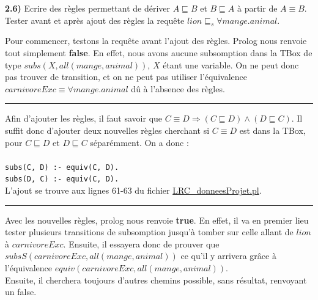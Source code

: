\documentclass[a4paper,12pt]{report}
\begin{document}

\newpage

{}

\textbf{2.6)} Ecrire des règles permettant de dériver \(A \sqsubseteq B\) et \(B \sqsubseteq A\) à partir de \(A \equiv B\). Tester avant et 
    après ajout des règles la requête \(lion \sqsubseteq_s \forall mange.animal\).



\begin{tcolorbox}[colback=gray!10, colframe=blue!30, coltitle=black, title=Réponse à la question 2.6 - 1/1]

    Pour commencer, testons la requête avant l'ajout des règles. Prolog nous renvoie tout simplement \textbf{false}. En effet, nous avons aucune
        subsomption dans la TBox de type \(subs(X, all(mange, animal))\), \(X\) étant une variable. On ne peut donc pas trouver de transition, et 
        on ne peut pas utiliser l'équivalence \(carnivoreExc \equiv \forall mange.animal\) dû à l'absence des règles.

    \vspace{0.5cm}
    \hrule
    \vspace{0.5cm}

    Afin d'ajouter les règles, il faut savoir que \(C \equiv D \Rightarrow (C \sqsubseteq D) \land (D \sqsubseteq C)\). Il suffit donc d'ajouter
        deux nouvelles règles cherchant si \(C \equiv D\) est dans la TBox, pour \(C \sqsubseteq D\) et \(D \sqsubseteq C\) séparémment. On a donc :\\\\
    \texttt{subs(C, D) :- equiv(C, D).}\\
    \texttt{subs(D, C) :- equiv(C, D).}\\

    L'ajout se trouve aux lignes 61-63 du fichier \href{./src/LRC\_donneesProjet.pl}{LRC\_donneesProjet.pl}.

    \vspace{0.5cm}
    \hrule
    \vspace{0.5cm}

    Avec les nouvelles règles, prolog nous renvoie \textbf{true}. En effet, il va en premier lieu tester plusieurs transitions de subsomption jusqu'à tomber
        sur celle allant de \(lion\) à \(carnivoreExc\). Ensuite, il essayera donc de prouver que \(subsS(carnivoreExc, all(mange, animal))\) ce qu'il y arrivera
        grâce à l'équivalence \(equiv(carnivoreExc, all(mange, animal))\).\\

    Ensuite, il cherchera toujours d'autres chemins possible, sans résultat, renvoyant un false.

\end{tcolorbox}
\end{document}
